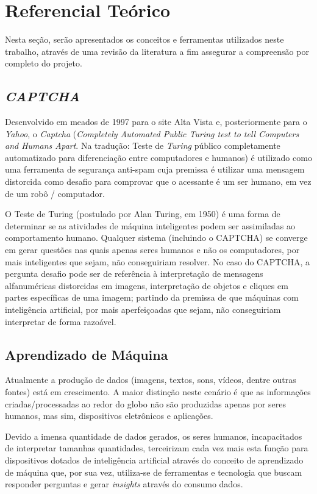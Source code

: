 \section{Referencial Teórico}
Nesta seção, serão apresentados os conceitos e ferramentas utilizados neste trabalho, através de uma revisão da literatura a fim assegurar a compreensão por completo do projeto. 

\subsection{\textit{CAPTCHA}}

Desenvolvido em meados de 1997 para o site Alta Vista e, posteriormente para o \textit{Yahoo}, o \textit{Captcha} (\textit{Completely Automated Public Turing test to tell Computers and Humans Apart}. Na tradução: Teste de \textit{Turing} público completamente automatizado para diferenciação entre computadores e humanos) é utilizado como uma ferramenta de segurança anti-spam cuja premissa é utilizar uma mensagem distorcida como desafio para comprovar que o acessante é um ser humano, em vez de um robô / computador.

O Teste de Turing (postulado por  Alan Turing, em 1950) é uma forma de determinar se as atividades de máquina inteligentes podem ser assimiladas ao comportamento humano.  Qualquer sistema (incluindo o CAPTCHA) se converge em gerar questões nas quais apenas seres humanos e não os computadores, por mais inteligentes que sejam, não conseguiriam resolver. No caso do CAPTCHA, a pergunta desafio pode ser de referência à interpretação de mensagens alfanuméricas distorcidas em imagens, interpretação de objetos e cliques em partes específicas de uma imagem; partindo da premissa de que máquinas com inteligência artificial, por mais aperfeiçoadas que sejam, não conseguiriam interpretar de forma razoável.

\subsection{Aprendizado de Máquina}

Atualmente a produção de dados (imagens, textos, sons, vídeos, dentre outras fontes) está em crescimento. A maior distinção neste cenário é que as informações criadas/processadas ao redor do globo não são produzidas apenas por seres humanos, mas sim, dispositivos eletrônicos e aplicações. 

Devido a imensa quantidade de dados gerados, os seres humanos, incapacitados de interpretar tamanhas quantidades, terceirizam cada vez mais esta função para dispositivos dotados de inteligência artificial através do conceito de aprendizado de máquina que, por sua vez, utiliza-se de ferramentas e tecnologia que buscam responder perguntas e gerar \textit{insights} através do consumo dados\cite{santos2018identificaccao}.

